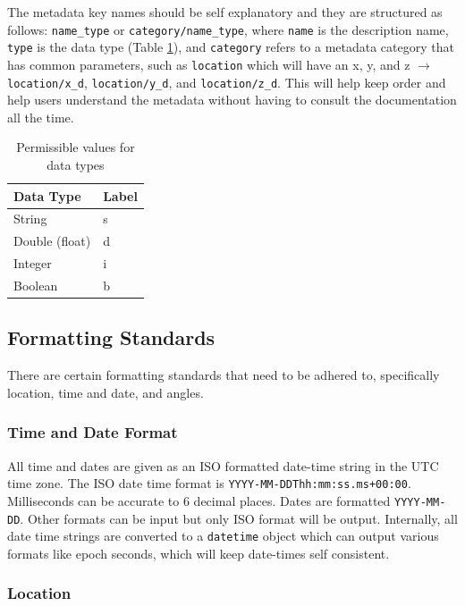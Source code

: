 \documentclass{article}
\begin{document}
The metadata key names should be self explanatory and they are structured as follows: \verb|name_type| or \verb|category/name_type|, where \verb|name| is the description name, \verb|type| is the data type (Table \ref{tab:types}), and \verb|category| refers to a metadata category that has common parameters, such as \verb|location| which will have an x, y, and z $\longrightarrow$ \verb|location/x_d|, \verb|location/y_d|, and \verb|location/z_d|. This will help keep order and help users understand the metadata without having to consult the documentation all the time. 

\begin{table}[htb!]
	\caption[Data types]{Permissible values for data types}
	\begin{tabular}{|l|l|}
		\hline
		\textbf{Data Type} & \textbf{Label} \\
		\hline
		String & s \\ \hline
		Double (float) & d \\ \hline
		Integer & i \\ \hline
		Boolean & b \\ \hline
	\end{tabular}
	\label{tab:types}
\end{table}

\subsection{Formatting Standards}

There are certain formatting standards that need to be adhered to, specifically location, time and date, and angles.

\subsubsection{Time and Date Format}

All time and dates are given as an ISO formatted date-time string in the UTC time zone.  The ISO date time format is \verb|YYYY-MM-DDThh:mm:ss.ms+00:00|.  Milliseconds can be accurate to 6 decimal places.  Dates are formatted \verb|YYYY-MM-DD|.  Other formats can be input but only ISO format will be output.  Internally, all date time strings are converted to a \verb|datetime| object which can output various formats like epoch seconds, which will keep date-times self consistent.

\subsubsection{Location}
\end{document}
